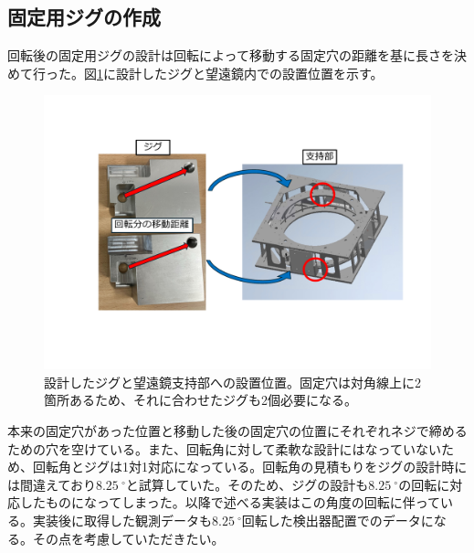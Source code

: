 \subsection{固定用ジグの作成}
回転後の固定用ジグの設計は回転によって移動する固定穴の距離を基に長さを決めて行った。図\ref{jig_fixing}に設計したジグと望遠鏡内での設置位置を示す。
\begin{figure}[htbp]
  \centering
  \includegraphics[width=0.85\columnwidth]{5_alignment/figs/jig_making.pdf}
  \caption{設計したジグと望遠鏡支持部への設置位置。固定穴は対角線上に2箇所あるため、それに合わせたジグも2個必要になる。}
  \label{jig_fixing}
\end{figure}
本来の固定穴があった位置と移動した後の固定穴の位置にそれぞれネジで締めるための穴を空けている。また、回転角に対して柔軟な設計にはなっていないため、回転角とジグは1対1対応になっている。回転角の見積もりをジグの設計時には間違えており$\SI{8.25}{^{\circ}}$と試算していた。そのため、ジグの設計も$\SI{8.25}{^{\circ}}$の回転に対応したものになってしまった。以降で述べる実装はこの角度の回転に伴っている。実装後に取得した観測データも$\SI{8.25}{^{\circ}}$回転した検出器配置でのデータになる。その点を考慮していただきたい。

